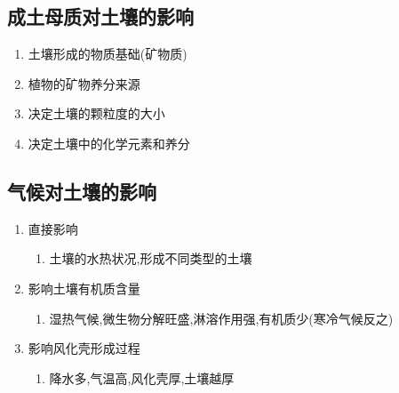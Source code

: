 \documentclass[a4paper]{article}
\begin{document}
    \subsection{成土母质对土壤的影响}
    \begin{enumerate}
        \item 土壤形成的物质基础(矿物质)
        \item 植物的矿物养分来源
        \item 决定土壤的颗粒度的大小
        \item 决定土壤中的化学元素和养分
    \end{enumerate}
    \subsection{气候对土壤的影响}
    \begin{enumerate}
        \item 直接影响
        \begin{enumerate}
            \item 土壤的水热状况,形成不同类型的土壤
        \end{enumerate}
        \item 影响土壤有机质含量
        \begin{enumerate}
            \item 湿热气候,微生物分解旺盛,淋溶作用强,有机质少(寒冷气候反之)
        \end{enumerate}
        \item 影响风化壳形成过程
        \begin{enumerate}
            \item 降水多,气温高,风化壳厚,土壤越厚
        \end{enumerate}
    \end{enumerate}
\end{document}
